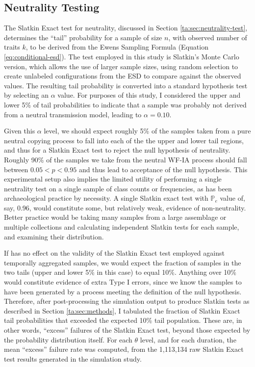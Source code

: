 \subsection{Neutrality Testing}
\label{sec:slatkin-ta-effects}

The Slatkin Exact test for neutrality, discussed in Section \ref{ta:sec:neutrality-test}, determines the ``tail'' probability for a sample of size $n$, with observed number of traits $k$, to be derived from the Ewens Sampling Formula (Equation \ref{eq:conditional-esd}).  The test employed in this study is Slatkin's Monte Carlo version, which allows the use of larger sample sizes, using random selection to create unlabeled configurations from the ESD to compare against the observed values.  The resulting tail probability is converted into a standard hypothesis test by selecting an $\alpha$ value.  For purposes of this study, I considered the upper and lower 5\% of tail probabilities to indicate that a sample was probably not derived from a neutral transmission model, leading to $\alpha = 0.10$.  

Given this $\alpha$ level, we should expect roughly 5\% of the samples taken from a pure neutral copying process to fall into each of the the upper and lower tail regions, and thus for a Slatkin Exact test to reject the null hypothesis of neutrality.  Roughly 90\% of the samples we take from the neutral WF-IA process should fall between $0.05 < p < 0.95$ and thus lead to acceptance of the null hypothesis.  This experimental setup also implies the limited utility of performing a single neutrality test on a single sample of class counts or frequencies, as has been archaeological practice by necessity.  A single Slatkin exact test with $\mathbb{P}_e$ value of, say, 0.96, would constitute some, but relatively weak, evidence of non-neutrality.  Better practice would be taking many samples from a large assemblage or multiple collections and calculating independent Slatkin tests for each sample, and examining their distribution.  

If \timeav has no effect on the validity of the Slatkin Exact test employed against temporally aggregated samples, we would expect the fraction of samples in the two tails (upper and lower 5\% in this case) to equal 10\%.  Anything over 10\% would constitute evidence of extra Type I errors, since we know the samples to have been generated by a process meeting the definition of the null hypothesis.  Therefore, after post-processing the simulation output to produce Slatkin tests as described in Section \ref{ta:sec:methods}, I tabulated the fraction of Slatkin Exact tail probabilities that exceeded the expected 10\% tail population.  These are, in other words, ``excess'' failures of the Slatkin Exact test, beyond those expected by the probability distribution itself.  For each $\theta$ level, and for each \timeav duration, the mean ``excess'' failure rate was computed, from the 1,113,134 raw Slatkin Exact test results generated in the simulation study.  

